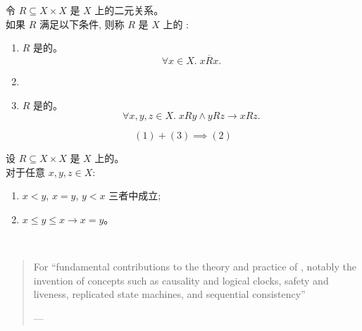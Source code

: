 \begin{frame}{}
  \begin{definition}
    令 $R \subseteq X \times X$ 是 $X$ 上的二元关系。\\[3pt]
    如果 $R$ 满足以下条件, 则称 $R$ 是 $X$ 上的 : \\[6pt]
    \begin{enumerate}[(1)]
      \setlength{\itemsep}{6pt}
      \item $R$ 是的。
        \[
          \forall x \in X.\; x \overline{R} x.
        \]
      \item {}
      \item $R$ 是的。
        \[
          \forall x, y, z \in X.\; x R y \land y R z \to x R z.
        \]
    \end{enumerate}
  \end{definition}

  \pause
  \vspace{-0.20cm}
  \[
    (1) + (3) \implies (2)
  \]
\end{frame}

\begin{frame}{}
  \begin{theorem}
    设 $R \subseteq X \times X$ 是 $X$ 上的。\\[5pt]
    对于任意 $x, y, z \in X$: \\[6pt]
    \begin{enumerate}[(1)]
      \setlength{\itemsep}{6pt}
      \item $x < y$, $x = y$, $y < x$ 三者中成立;
      \item $x \le y \le x \to x = y$。
    \end{enumerate}
  \end{theorem}
\end{frame}

\begin{frame}{}

  \begin{center}
     \\[3pt]
  \end{center}

  \begin{quote}
    For ``fundamental contributions to the theory and practice of
      ,
      notably the invention of concepts
      such as causality and logical clocks,
      safety and liveness, replicated state machines,
      and sequential consistency''

    \hfill  --- 
  \end{quote}
\end{frame}

